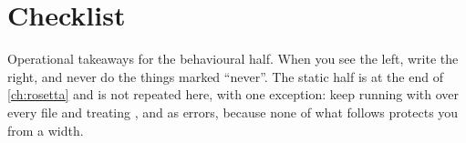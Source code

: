 \section{Checklist}
\label{sec:rosetta2:checklist}

Operational takeaways for the behavioural half. When you see the left, write
the right, and never do the things marked ``never''. The static half is at the
end of \cref{ch:rosetta} and is not repeated here, with one exception: keep
running  with  over every file and treating
,  and  as errors, because
none of what follows protects you from a width.


